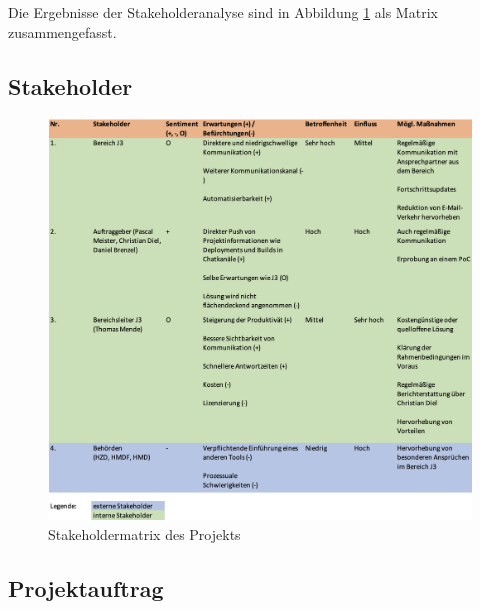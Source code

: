 \documentclass[ThesisDJ.tex]{subfiles}
\begin{document}
  Die Ergebnisse der Stakeholderanalyse sind in Abbildung \ref{fig:stakeholders} als Matrix zusammengefasst.

  \newpage
  \subsection{Stakeholder}
    \begin{figure}[h!]
      \includegraphics[width=\textwidth]{stakeholders.png}
      \centering
      \caption{Stakeholdermatrix des Projekts}
      \label{fig:stakeholders}
    \end{figure}

	
	\subsection{Projektauftrag}
	
\end{document}
